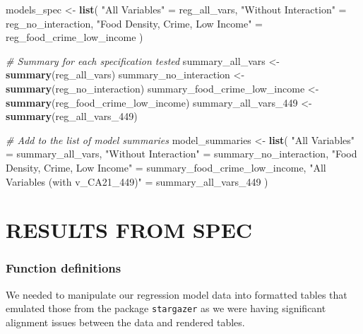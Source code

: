 \documentclass[
]{article}
\newenvironment{Shaded}{\begin{snugshade}}{\end{snugshade}}
\newcommand{\CommentTok}[1]{\textcolor[rgb]{0.56,0.35,0.01}{\textit{#1}}}
\newcommand{\FunctionTok}[1]{\textcolor[rgb]{0.13,0.29,0.53}{\textbf{#1}}}
\newcommand{\NormalTok}[1]{#1}
\newcommand{\OtherTok}[1]{\textcolor[rgb]{0.56,0.35,0.01}{#1}}
\newcommand{\StringTok}[1]{\textcolor[rgb]{0.31,0.60,0.02}{#1}}
\begin{document}
\begin{Shaded}
\begin{Highlighting}[]
\NormalTok{models\_spec }\OtherTok{\textless{}{-}} \FunctionTok{list}\NormalTok{(}
  \StringTok{"All Variables"} \OtherTok{=}\NormalTok{ reg\_all\_vars,}
  \StringTok{"Without Interaction"} \OtherTok{=}\NormalTok{ reg\_no\_interaction,}
  \StringTok{"Food Density, Crime, Low Income"} \OtherTok{=}\NormalTok{ reg\_food\_crime\_low\_income}
\NormalTok{)}

\CommentTok{\# Summary for each specification tested}
\NormalTok{summary\_all\_vars }\OtherTok{\textless{}{-}} \FunctionTok{summary}\NormalTok{(reg\_all\_vars)}
\NormalTok{summary\_no\_interaction }\OtherTok{\textless{}{-}} \FunctionTok{summary}\NormalTok{(reg\_no\_interaction)}
\NormalTok{summary\_food\_crime\_low\_income }\OtherTok{\textless{}{-}} \FunctionTok{summary}\NormalTok{(reg\_food\_crime\_low\_income)}
\NormalTok{summary\_all\_vars\_449 }\OtherTok{\textless{}{-}} \FunctionTok{summary}\NormalTok{(reg\_all\_vars\_449)}

\CommentTok{\# Add to the list of model summaries}
\NormalTok{model\_summaries }\OtherTok{\textless{}{-}} \FunctionTok{list}\NormalTok{(}
  \StringTok{"All Variables"} \OtherTok{=}\NormalTok{ summary\_all\_vars,}
  \StringTok{"Without Interaction"} \OtherTok{=}\NormalTok{ summary\_no\_interaction,}
  \StringTok{"Food Density, Crime, Low Income"} \OtherTok{=}\NormalTok{ summary\_food\_crime\_low\_income,}
  \StringTok{"All Variables (with v\_CA21\_449)"} \OtherTok{=}\NormalTok{ summary\_all\_vars\_449}
\NormalTok{)}
\end{Highlighting}
\end{Shaded}

\section{RESULTS FROM SPEC}\label{results-from-spec}

\subsubsection{Function definitions}\label{function-definitions}

We needed to manipulate our regression model data into formatted tables
that emulated those from the package \texttt{stargazer} as we were
having significant alignment issues between the data and rendered
tables.
\end{document}
